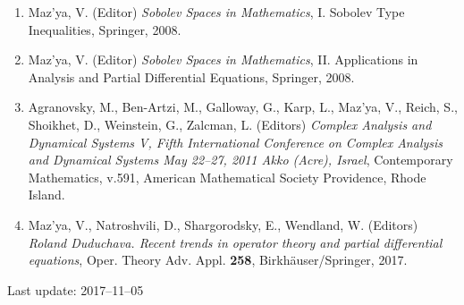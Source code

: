 \documentclass{article}
\newcommand{\authors}[1]{\item #1\ignorespaces}
\renewcommand{\title}[1]{, \textit{#1}\ignorespaces}
\newcommand{\journal}[1]{, {#1}\ignorespaces}
\newcommand{\jitem}[1]{.}
\begin{document}
\begin{enumerate}
\item Maz'ya, V. (Editor)
 {\it Sobolev Spaces in Mathematics},  I. Sobolev Type Inequalities, Springer,  2008.

\item Maz'ya, V. (Editor)
 {\it Sobolev Spaces in Mathematics},  II. Applications in Analysis and Partial Differential Equations, Springer,  2008.


\item  Agranovsky, M.,  Ben-Artzi, M.,  Galloway, G.,
 Karp, L.,  Maz'ya, V.,  Reich, S.,  Shoikhet, D.,
  Weinstein, G.,  Zalcman, L.
(Editors) {\it Complex Analysis and
Dynamical Systems V,
Fifth International Conference on
Complex Analysis and Dynamical Systems
May 22--27, 2011
Akko (Acre), Israel}, Contemporary Mathematics, v.591, American Mathematical Society
Providence, Rhode Island.

\item Maz'ya, V., Natroshvili, D., Shargorodsky, E., Wendland, W. (Editors) {\it Roland Duduchava. Recent trends in operator theory and partial differential equations}, Oper. Theory Adv. Appl. {\bf 258}, Birkh\"auser/Springer, 2017.

\end{enumerate}

Last update: 2017--11--05
\end{document}
